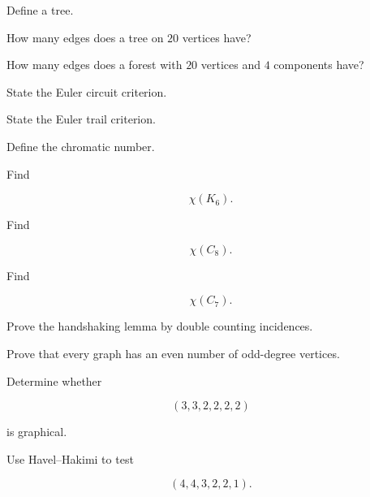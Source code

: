 \begin{exercise}[1]
Define a tree.
\end{exercise}

\begin{exercise}[1]
How many edges does a tree on \(20\) vertices have?
\end{exercise}

\begin{exercise}[1]
How many edges does a forest with \(20\) vertices and \(4\) components
have?
\end{exercise}

\begin{exercise}[1]
State the Euler circuit criterion.
\end{exercise}

\begin{exercise}[1]
State the Euler trail criterion.
\end{exercise}

\begin{exercise}[1]
Define the chromatic number.
\end{exercise}

\begin{exercise}[1]
Find

\[
\chi(K_6).
\]
\end{exercise}

\begin{exercise}[1]
Find

\[
\chi(C_8).
\]
\end{exercise}

\begin{exercise}[1]
Find

\[
\chi(C_7).
\]
\end{exercise}

\begin{exercise}[2]
Prove the handshaking lemma by double counting incidences.
\end{exercise}

\begin{exercise}[2]
Prove that every graph has an even number of odd-degree vertices.
\end{exercise}

\begin{exercise}[2]
Determine whether

\[
(3,3,2,2,2,2)
\]

is graphical.
\end{exercise}

\begin{exercise}[2]
Use Havel--Hakimi to test

\[
(4,4,3,2,2,1).
\]
\end{exercise}

